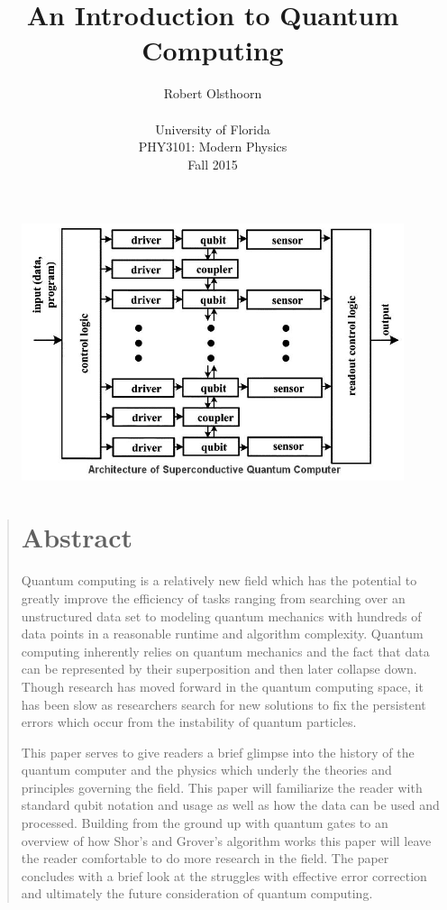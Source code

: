 \documentclass[12pt]{article}
\title{An Introduction to Quantum Computing}
\author
{Robert Olsthoorn\\
\\
\normalsize{University of Florida}\\
\normalsize{PHY3101: Modern Physics}\\
\normalsize{Fall 2015}\\
}
\date{}
\newenvironment{sciabstract}{%
\begin{quote} \bf}
{\end{quote}}
\begin{document}
 





\begin{figure}
\includegraphics[scale=.5]{superconductive}
\centering
\end{figure}

\maketitle 


\newpage

\begin{sciabstract}
\section*{Abstract}
Quantum computing is a relatively new field which has the potential to greatly improve the efficiency of tasks ranging from searching over an unstructured data set to modeling quantum mechanics with hundreds of data points in a reasonable runtime and algorithm complexity. Quantum computing inherently relies on quantum mechanics and the fact that data can be represented by their superposition and then later collapse down. Though research has moved forward in the quantum computing space, it has been slow as researchers search for new solutions to fix the persistent errors which occur from the instability of quantum particles.\par
This paper serves to give readers a brief glimpse into the history of the quantum computer and the physics which underly the theories and principles governing the field. This paper will familiarize the reader with standard qubit notation and usage as well as how the data can be used and processed. Building from the ground up with quantum gates to an overview of how Shor's and Grover's algorithm works this paper will leave the reader comfortable to do more research in the field. The paper concludes with a brief look at the struggles with effective error correction and ultimately the future consideration of quantum computing.

\end{sciabstract}
\end{document}
